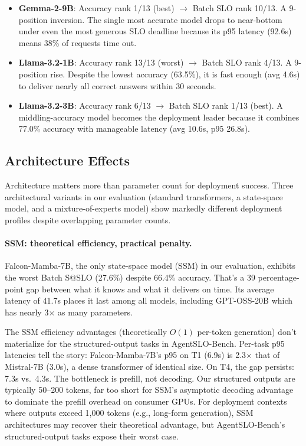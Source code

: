 \documentclass[11pt]{article}
\begin{document}
\begin{itemize}[leftmargin=*]
\item \textbf{Gemma-2-9B}: Accuracy rank 1/13 (best) $\to$ Batch SLO rank 10/13.  A 9-position inversion.  The single most accurate model drops to near-bottom under even the most generous SLO deadline because its p95 latency (92.6s) means 38\% of requests time out.

\item \textbf{Llama-3.2-1B}: Accuracy rank 13/13 (worst) $\to$ Batch SLO rank 4/13.  A 9-position rise.  Despite the lowest accuracy (63.5\%), it is fast enough (avg 4.6s) to deliver nearly all correct answers within 30 seconds.

\item \textbf{Llama-3.2-3B}: Accuracy rank 6/13 $\to$ Batch SLO rank 1/13 (best).  A middling-accuracy model becomes the deployment leader because it combines 77.0\% accuracy with manageable latency (avg 10.6s, p95 26.8s).
\end{itemize}

\subsection{Architecture Effects}

Architecture matters more than parameter count for deployment success.  Three architectural variants in our evaluation (standard transformers, a state-space model, and a mixture-of-experts model) show markedly different deployment profiles despite overlapping parameter counts.

\paragraph{SSM: theoretical efficiency, practical penalty.}
Falcon-Mamba-7B, the only state-space model (SSM) in our evaluation, exhibits the worst Batch S@SLO (27.6\%) despite 66.4\% accuracy.  That's a 39 percentage-point gap between what it knows and what it delivers on time.  Its average latency of 41.7s places it last among all models, including GPT-OSS-20B which has nearly 3$\times$ as many parameters.

The SSM efficiency advantages (theoretically $O(1)$ per-token generation) don't materialize for the structured-output tasks in AgentSLO-Bench.  Per-task p95 latencies tell the story: Falcon-Mamba-7B's p95 on T1 (6.9s) is 2.3$\times$ that of Mistral-7B (3.0s), a dense transformer of identical size.  On T4, the gap persists: 7.3s vs.\ 4.3s.  The bottleneck is prefill, not decoding.  Our structured outputs are typically 50--200 tokens, far too short for SSM's asymptotic decoding advantage to dominate the prefill overhead on consumer GPUs.  For deployment contexts where outputs exceed 1{,}000 tokens (e.g., long-form generation), SSM architectures may recover their theoretical advantage, but AgentSLO-Bench's structured-output tasks expose their worst case.
\end{document}
